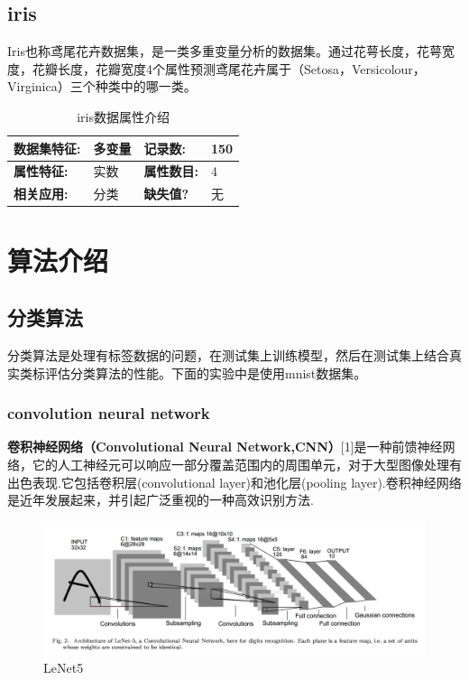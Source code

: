 \documentclass{article}
\begin{document}
\subsection{iris}
Iris也称鸢尾花卉数据集，是一类多重变量分析的数据集。通过花萼长度，花萼宽度，花瓣长度，花瓣宽度4个属性预测鸢尾花卉属于（Setosa，Versicolour，Virginica）三个种类中的哪一类。

\begin{table}[htb]
\begin{tabularx}{\textwidth}{|X|X|X|X|}
\hline
\textbf{数据集特征:} & 多变量 & \textbf{记录数:} & 150 \\
\hline
\textbf{属性特征:} & 实数 & \textbf{属性数目:} & 4 \\
\hline
\textbf{相关应用:} & 分类 & \textbf{缺失值?} & 无 \\
\hline
\end{tabularx}
\caption{iris数据属性介绍}
\end{table}


\section{算法介绍}
	\subsection{分类算法}
	分类算法是处理有标签数据的问题，在测试集上训练模型，然后在测试集上结合真实类标评估分类算法的性能。下面的实验中是使用mnist数据集。
	\subsubsection{convolution neural network}
	\textbf{卷积神经网络（Convolutional Neural Network,CNN）}[1]是一种前馈神经网络，它的人工神经元可以响应一部分覆盖范围内的周围单元，对于大型图像处理有出色表现.它包括卷积层(convolutional layer)和池化层(pooling layer).卷积神经网络是近年发展起来，并引起广泛重视的一种高效识别方法.
	\begin{figure}[htb]
	\centering\includegraphics[scale=0.6]{cnn}
	\caption{LeNet5}\label{fig:2}
	\end{figure}
\end{document}
